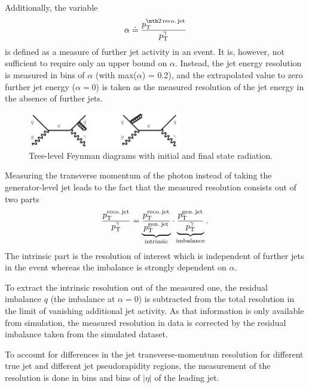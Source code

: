 Additionally, the variable 
\begin{equation*}
\label{res:eq:alphaDef}
\alpha \doteq \frac{\ptsecondrecojet}{\ptgamma}
\end{equation*} 
is defined as a measure of further jet activity in an event. 
It is, however, not sufficient to require only an upper bound on $\alpha$. 
Instead, the jet energy resolution is measured in bins of $\alpha$ (with max($\alpha$) = 0.2), 
and the extrapolated value to zero further jet energy ($\alpha=0$) is taken as the measured resolution of the jet energy in the absence of further jets.
\begin{figure}[t]
  \centering
      \includegraphics[width=0.60\textwidth]{figures/resolution/generalApproach/FeynmanDiagramsWithRadiation.pdf}
  \caption{Tree-level Feynman diagrams with initial and final state radiation.}  
  \label{res:fig:FeynmanDiagramsWithRadiation}
\end{figure}

Measuring the transverse momentum of the photon instead of taking the generator-level jet \pt leads to the fact that the measured resolution consists out of two parts
\begin{equation*}\label{res:eq:splitting}
\frac{{p}_\mathrm{T}^{\text{reco.\,jet}}}{{p}_\mathrm{T}^{\gamma}} = \underbrace{\frac{{p}_\mathrm{T}^{\text{reco.\,jet}}}{{p}_\mathrm{T}^{\text{gen.\,jet}}}}_{\text{intrinsic}} \cdot \underbrace{\frac{{p}_\mathrm{T}^{\text{gen.\,jet}}}{{p}_\mathrm{T}^{\gamma}}}_{\text{imbalance}}.
\end{equation*}
The intrinsic part is the resolution of interest which is independent of further jets in the event whereas the imbalance is strongly dependent on $\alpha$.

To extract the intrinsic resolution out of the measured one, the residual imbalance $q$ (the imbalance at $\alpha = 0$) is subtracted from the total resolution in the 
limit of vanishing additional jet activity. 
As that information is only available from simulation, the measured resolution in data is corrected by the residual imbalance taken from the simulated dataset.

To account for differences in the jet transverse-momentum resolution for different true jet \pt and different jet pseudorapidity regions, the measurement of the resolution is done in \ptgamma bins and bins of $|\eta|$ of the leading jet.

